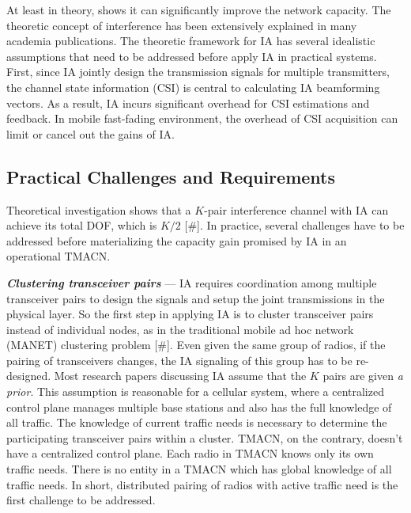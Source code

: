 \documentclass[letterpaper,11pt]{article}
\begin{document}
At least in theory, shows it can significantly improve the network capacity. The theoretic concept of interference has been extensively explained in many academia publications. The theoretic framework for IA has several idealistic assumptions that need to be addressed before apply IA in practical systems. First, since IA jointly design the transmission signals for multiple transmitters, the channel state information (CSI) is central to calculating IA beamforming vectors. As a result, IA incurs significant overhead for CSI estimations and feedback. In mobile fast-fading environment, the overhead of CSI acquisition can limit or cancel out the gains of IA. 

\subsection{Practical Challenges and Requirements}

Theoretical investigation shows that a $K$-pair interference channel with IA can achieve its total DOF, which is $K/2$ [\#].  In practice, several challenges have to be addressed before materializing the capacity gain promised by IA in an operational TMACN.

{\textbf{\textit{Clustering transceiver pairs}}} --- IA requires coordination among multiple transceiver pairs to design the signals and setup the joint transmissions in the physical layer. So the first step in applying IA is to cluster transceiver pairs instead of individual nodes, as in the traditional mobile ad hoc network (MANET) clustering problem  [\#]. Even given the same group of radios, if the pairing of transceivers changes, the IA signaling of this group has to be re-designed. Most research papers discussing IA assume that the $K$ pairs are given {\it{a prior}}. This assumption is reasonable for a cellular system, where a centralized control plane manages multiple base stations and also has the full knowledge of all traffic. The knowledge of current traffic needs is necessary to determine the participating transceiver pairs within a cluster. TMACN, on the contrary, doesn't have a centralized control plane. Each radio in TMACN knows only its own traffic needs. There is no entity in a TMACN which has global knowledge of all traffic needs. In short, distributed pairing of radios with active traffic need is the first challenge to be addressed.
\end{document}
